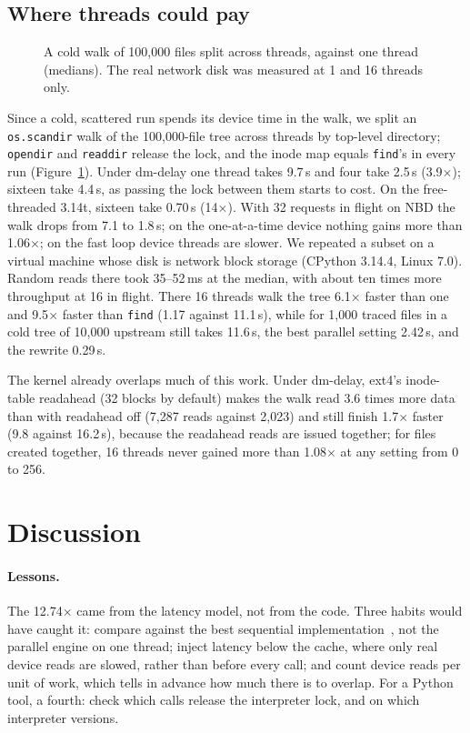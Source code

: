 \subsection{Where threads could pay}
\label{ws:walk}

\begin{figure}[t]
\centering
{}
\caption{A cold walk of 100{,}000 files split across threads, against one thread
(medians). The real network disk was measured at 1 and 16 threads only.}
\label{ws:fig:walk}
\end{figure}

Since a cold, scattered run spends its device time in the walk, we split an
\texttt{os.scandir} walk of the 100{,}000-file tree across threads by top-level
directory; \texttt{opendir} and \texttt{readdir} release the lock, and the inode map
equals \texttt{find}'s in every run (Figure~\ref{ws:fig:walk}). Under dm-delay one thread
takes 9.7\,s and four take 2.5\,s (3.9$\times$); sixteen take 4.4\,s, as passing the lock
between them starts to cost. On the free-threaded 3.14t, sixteen take 0.70\,s (14$\times$). With 32 requests in flight on NBD the walk drops from 7.1 to
1.8\,s; on the one-at-a-time device nothing gains more than 1.06$\times$; on the fast loop
device threads are slower. We repeated a subset on a virtual machine whose disk is
network block storage (CPython 3.14.4, Linux 7.0). Random reads there took 35--52\,ms at
the median, with about ten times more throughput at 16 in flight. There 16 threads walk
the tree 6.1$\times$ faster than one and 9.5$\times$ faster than \texttt{find} (1.17 against
11.1\,s), while for 1{,}000 traced files in a cold tree of 10{,}000 upstream still takes
11.6\,s, the best parallel setting 2.42\,s, and the rewrite 0.29\,s.

The kernel already overlaps much of this work. Under dm-delay, ext4's inode-table
readahead (32 blocks by default) makes the walk read 3.6 times more data than with
readahead off (7{,}287 reads against 2{,}023) and still finish 1.7$\times$ faster (9.8
against 16.2\,s), because the readahead reads are issued together; for files created
together, 16 threads never gained more than 1.08$\times$ at any setting from 0 to 256.

\section{Discussion}

\paragraph{Lessons.} The 12.74$\times$ came from the latency model, not from the code.
Three habits would have caught it: compare against the best sequential
implementation~\cite{mcsherry2015cost}, not the parallel engine on one thread; inject
latency below the cache, where only real device reads are slowed, rather than before
every call; and count device reads per unit of work, which tells in advance how much
there is to overlap. For a Python tool, a fourth: check which calls release the
interpreter lock, and on which interpreter versions.

